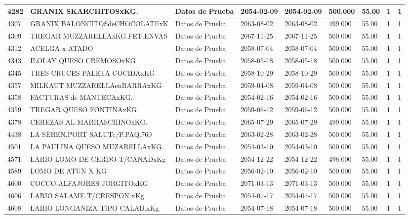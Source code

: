 \documentclass[a4paper,12pt]{article}
\begin{document}
\begin{landscape}
\begin{longtable}{|p{4cm}|p{2.5cm}|p{2.5cm}|p{1.8cm}|p{1.8cm}|p{1cm}|p{1cm}|p{3cm}|p{3cm}||}
4282 & GRANIX SKARCHITOSxKG. & Datos de Prueba & 2054-02-09 & 2054-02-09 & 500.000 & 55.00 & 1 & 1 \\ \hline 
4307 & GRANIX BALONCITOSdeCHOCOLATExK & Datos de Prueba & 2063-08-02 & 2063-08-02 & 499.000 & 55.00 & 1 & 1 \\ \hline 
4309 & TREGAR MUZZARELLAxKG.FET.ENVAS & Datos de Prueba & 2067-11-25 & 2067-11-25 & 500.000 & 55.00 & 1 & 1 \\ \hline 
4312 & ACELGA x ATADO & Datos de Prueba & 2058-07-04 & 2058-07-04 & 500.000 & 55.00 & 1 & 1 \\ \hline 
4343 & ILOLAY QUESO CREMOSOxKG & Datos de Prueba & 2058-05-18 & 2058-05-18 & 500.000 & 55.00 & 1 & 1 \\ \hline 
4345 & TRES CRUCES PALETA COCIDAxKG & Datos de Prueba & 2058-10-29 & 2058-10-29 & 500.000 & 55.00 & 1 & 1 \\ \hline 
4357 & MILKAUT MUZZARELLAenBARRAxKG & Datos de Prueba & 2059-04-08 & 2059-04-08 & 500.000 & 55.00 & 1 & 1 \\ \hline 
4358 & FACTURAS de MANTECAxKG. & Datos de Prueba & 2054-02-16 & 2054-02-16 & 500.000 & 55.00 & 1 & 1 \\ \hline 
4359 & TREGAR QUESO FONTINAxKG & Datos de Prueba & 2059-06-12 & 2059-06-12 & 500.000 & 55.00 & 1 & 1 \\ \hline 
4378 & CEREZAS AL MARRASCHINOxKG. & Datos de Prueba & 2065-07-29 & 2065-07-29 & 499.000 & 55.00 & 1 & 1 \\ \hline 
4438 & LA SEREN.PORT SALUTc/P.PAQ.760 & Datos de Prueba & 2063-02-28 & 2063-02-28 & 500.000 & 55.00 & 1 & 1 \\ \hline 
4501 & LA PAULINA QUESO MUZARELLAxKG. & Datos de Prueba & 2054-03-10 & 2054-03-10 & 500.000 & 55.00 & 1 & 1 \\ \hline 
4571 & LARIO LOMO DE CERDO T/CANADxKg & Datos de Prueba & 2054-12-22 & 2054-12-22 & 498.000 & 55.00 & 1 & 1 \\ \hline 
4589 & LOMO DE ATUN X KG & Datos de Prueba & 2056-02-10 & 2056-02-10 & 500.000 & 55.00 & 1 & 1 \\ \hline 
4600 & COCCO-ALFAJORES JORGITOxKG. & Datos de Prueba & 2071-03-13 & 2071-03-13 & 500.000 & 55.00 & 1 & 1 \\ \hline 
4606 & LARIO SALAME T/CRESPON xKg & Datos de Prueba & 2054-07-17 & 2054-07-17 & 500.000 & 55.00 & 1 & 1 \\ \hline 
4608 & LARIO LONGANIZA TIPO CALAB.xKg & Datos de Prueba & 2054-07-18 & 2054-07-18 & 500.000 & 55.00 & 1 & 1 \\ \hline 

\end{longtable}
\end{landscape}
\end{document}
